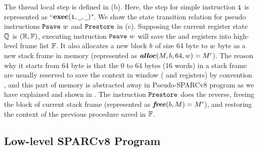 The thread local step is defined in
\Fig{\ref{fig:selected-opsem-high-level-prog}} (b).
Here, the step for simple instruction $\texttt{i}{}$ is
represented as ``$\textbf{exec}({\texttt{i}{}}, {\underline{\ \,}}, {\underline{\ \,}})$".
We show the state transition relation for pseudo instructions
$\texttt{Psave} \ w$ and $\texttt{Prestore}$ in
\Fig{\ref{fig:selected-opsem-high-level-prog}} (c).
Supposing the current register state $\mathbb{Q}$ is
$(\mathbb{R}, \mathbb{F})$, executing instruction
$\texttt{Psave} \ w$ will save the \localRN{} and \inRN{} registers
into high-level frame list $\mathbb{F}$. It also allocates
a new block $b$ of size 64 byte to $w$ byte
as a new stack frame in memory
(represented as $\textbf{\textit{alloc}}(M, b, 64, w) = M'$).
The reason why it starts from 64 byte is that the 0 to 64 bytes
(16 words) in a stack frame are usually reserved to save
the context in window (\localRN{} and \inRN{} registers)
by convention \cite{sparc},
and this part of memory is abstracted away in
Pseudo-SPARCv8 program as we have explained and shown in
\Fig{\ref{fig:Abstraction of Register Windows and Memory}}.
The instruction $\texttt{Prestore}$ does the reverse,
freeing the block of current stack frame
(represented as $\textbf{\textit{free}}(b, M) = M'$), and
restoring the context of the previous procedure
saved in $\mathbb{F}$.

\subsection{Low-level SPARCv8 Program}
\label{subsec:low-level SPARCv8 Program}


